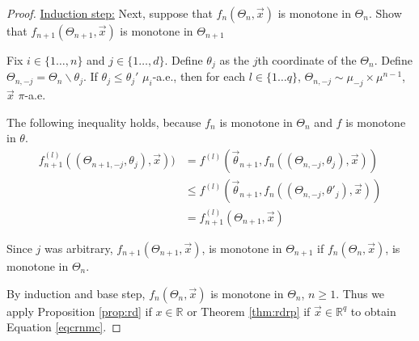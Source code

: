 \documentclass[12pt]{article}
\theoremstyle{plain}%
\theoremstyle{definition}
\begin{document}
\begin{proof}
		\underline{Induction step:}
		Next, suppose that  $f_n(\Theta_n,\vec{x})$ is monotone in $\Theta_n$. Show that $f_{n+1}(\Theta_{n+1},\vec{x})$ is monotone in $\Theta_{n+1}$
		
		Fix $i\in \{1\ldots,n\}$ and $j\in \{1\ldots, d\}$. Define $\theta_{j}$ as the $j$th coordinate of the $\Theta_n$. Define $\Theta_{n,-j}=\Theta_n\backslash \theta_{j}$. If $\theta_{j}\leq \theta_{j}'$ $\mu_i$-a.e., then for each $l\in \{1\ldots q\}$, $\Theta_{n,-j}\sim\mu_{-j}\times\mu^{n-1}$, $\vec{x}$ $\pi$-a.e.
		
		The following inequality holds, because $f_{n}$ is monotone in $\Theta_n$ and $f$ is monotone in $\theta$.
		\begin{align*}
			f^{(l)}_{n+1}((\Theta_{n+1,-j},\theta_{j}),\vec{x}))&=f^{(l)}(\vec{\theta}_{n+1},f_{n}((\Theta_{n,-j},\theta_{j}),\vec{x}))\\
			&\leq f^{(l)}(\vec{\theta}_{n+1},f_{n}((\Theta_{n,-j},\theta'_{j}),\vec{x}))\\
			&=f^{(l)}_{n+1}(\Theta_{n+1},\vec{x})
		\end{align*}  
		
		Since $j$ was arbitrary, $f_{n+1}(\Theta_{n+1},\vec{x})$, is monotone in $\Theta_{n+1}$ if $f_{n}(\Theta_{n},\vec{x})$, is monotone in $\Theta_{n}$. 
		
		By induction and base step, $f_n(\Theta_n,\vec{x})$ is monotone in $\Theta_n$, $n\geq 1$. Thus we apply Proposition \ref{prop:rd} if $x\in\mathbb{R}$ or Theorem \ref{thm:rdrp} if $\vec{x}\in\mathbb{R}^q$ to obtain Equation \ref{eqcrnmc}.
	\end{proof}
	
\end{document}
